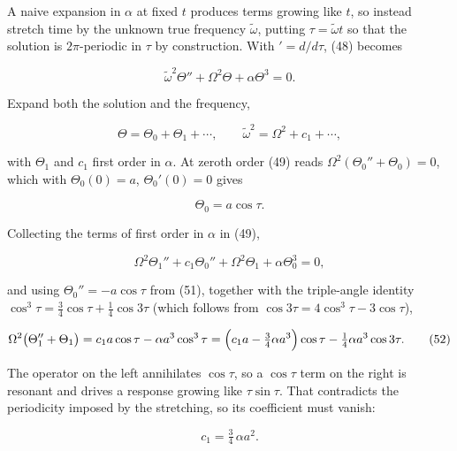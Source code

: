 \documentclass[11pt,a4paper]{article}
\newcommand{\tagmark}[1]{\marginnote{\scriptsize\ttfamily #1}}
\newcommand{\Dtag}{\tagmark{[D]}}   %
\begin{document}
A naive expansion in \(\alpha\) at fixed \(t\) produces terms growing like \(t\), so
instead stretch time by the unknown true frequency \(\tilde\omega\), putting
\(\tau=\tilde\omega t\) so that the solution is \(2\pi\)-periodic in \(\tau\) by
construction. With \('=d/d\tau\), (48) becomes

\begin{equation}
\tilde\omega^2\Theta'' + \Omega^2\Theta + \alpha\Theta^3 = 0. \tag{49}
\end{equation}

Expand both the solution and the frequency,

\begin{equation}
\Theta = \Theta_0 + \Theta_1 + \cdots,
  \qquad \tilde\omega^2 = \Omega^2 + c_1 + \cdots, \tag{50}
\end{equation}

with \(\Theta_1\) and \(c_1\) first order in \(\alpha\). At zeroth order (49) reads
\(\Omega^2(\Theta_0''+\Theta_0)=0\), which with \(\Theta_0(0)=a\),
\(\Theta_0'(0)=0\) gives

\begin{equation}
\Theta_0 = a\cos\tau. \tag{51}
\end{equation}

Collecting the terms of first order in \(\alpha\) in (49),

\[
\Omega^2\Theta_1'' + c_1\Theta_0'' + \Omega^2\Theta_1 + \alpha\Theta_0^3 = 0,
\]

and using \(\Theta_0''=-a\cos\tau\) from (51), together with the triple-angle
identity \(\cos^3\tau=\tfrac34\cos\tau+\tfrac14\cos3\tau\) (which follows from
\(\cos3\tau=4\cos^3\tau-3\cos\tau\)),

\begin{equation}
\Omega^2\bigl(\Theta_1''+\Theta_1\bigr)
 = c_1 a\cos\tau - \alpha a^3\cos^3\tau
 = \Bigl(c_1a - \tfrac34\alpha a^3\Bigr)\cos\tau
   - \tfrac14\alpha a^3\cos3\tau. \tag{52}
\end{equation}

\Dtag{} The operator on the left annihilates \(\cos\tau\), so a \(\cos\tau\) term on
the right is resonant and drives a response growing like \(\tau\sin\tau\). That
contradicts the periodicity imposed by the stretching, so its coefficient must
vanish:

\begin{equation}
c_1 = \tfrac34\,\alpha a^2. \tag{53}
\end{equation}
\end{document}
